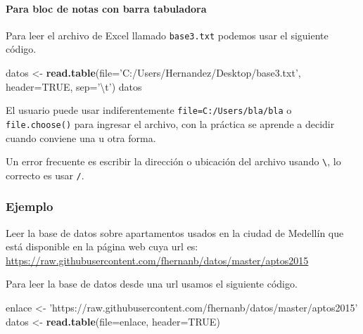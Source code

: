 \documentclass[10pt,]{krantz}
\makeatletter
\newenvironment{Shaded}{\begin{snugshade}}{\end{snugshade}}
\newcommand{\KeywordTok}[1]{\textcolor[rgb]{0.13,0.29,0.53}{\textbf{#1}}}
\newcommand{\DataTypeTok}[1]{\textcolor[rgb]{0.13,0.29,0.53}{#1}}
\newcommand{\CharTok}[1]{\textcolor[rgb]{0.31,0.60,0.02}{#1}}
\newcommand{\StringTok}[1]{\textcolor[rgb]{0.31,0.60,0.02}{#1}}
\newcommand{\OtherTok}[1]{\textcolor[rgb]{0.56,0.35,0.01}{#1}}
\newcommand{\NormalTok}[1]{#1}
\let\oldparagraph\paragraph
\renewcommand{\paragraph}[1]{\oldparagraph{#1}\mbox{}}
\newenvironment{kframe}{%
\medskip{}
\setlength{\fboxsep}{.8em}
 \def\at@end@of@kframe{}%
 \ifinner\ifhmode%
  \def\at@end@of@kframe{\end{minipage}}%
  \begin{minipage}{\columnwidth}%
 \fi\fi%
 \def\FrameCommand##1{\hskip\@totalleftmargin \hskip-\fboxsep
 \colorbox{shadecolor}{##1}\hskip-\fboxsep
     \hskip-\linewidth \hskip-\@totalleftmargin \hskip\columnwidth}%
 \MakeFramed {\advance\hsize-\width
   \@totalleftmargin\z@ \linewidth\hsize
   \@setminipage}}%
 {\par\unskip\endMakeFramed%
 \at@end@of@kframe}
\renewenvironment{Shaded}{\begin{kframe}}{\end{kframe}}
\let\BeginKnitrBlock\begin \let\EndKnitrBlock\end
\makeatother
\begin{document}
\paragraph{Para bloc de notas con barra
tabuladora}\label{para-bloc-de-notas-con-barra-tabuladora}

Para leer el archivo de Excel llamado \texttt{base3.txt} podemos usar el
siguiente código.

\begin{Shaded}
\begin{Highlighting}[]
\NormalTok{datos <-}\StringTok{ }\KeywordTok{read.table}\NormalTok{(}\DataTypeTok{file=}\StringTok{'C:/Users/Hernandez/Desktop/base3.txt'}\NormalTok{,}
                    \DataTypeTok{header=}\OtherTok{TRUE}\NormalTok{, }\DataTypeTok{sep=}\StringTok{'}\CharTok{\textbackslash{}t}\StringTok{'}\NormalTok{)}
\NormalTok{datos}
\end{Highlighting}
\end{Shaded}

\BeginKnitrBlock{rmdnote}
El usuario puede usar indiferentemente
\texttt{file=\textquotesingle{}C:/Users/bla/bla\textquotesingle{}} o
\texttt{file.choose()} para ingresar el archivo, con la práctica se
aprende a decidir cuando conviene una u otra forma.
\EndKnitrBlock{rmdnote}

\BeginKnitrBlock{rmdwarning}
Un error frecuente es escribir la dirección o ubicación del archivo
usando \texttt{\textbackslash{}}, lo correcto es usar \texttt{/}.
\EndKnitrBlock{rmdwarning}

\subsubsection*{Ejemplo}\label{ejemplo-10}

Leer la base de datos sobre apartamentos usados en la ciudad de Medellín
que está disponible en la página web cuya url es:
\url{https://raw.githubusercontent.com/fhernanb/datos/master/aptos2015}

Para leer la base de datos desde una url usamos el siguiente código.

\begin{Shaded}
\begin{Highlighting}[]
\NormalTok{enlace <-}\StringTok{ 'https://raw.githubusercontent.com/fhernanb/datos/master/aptos2015'}
\NormalTok{datos <-}\StringTok{ }\KeywordTok{read.table}\NormalTok{(}\DataTypeTok{file=}\NormalTok{enlace, }\DataTypeTok{header=}\OtherTok{TRUE}\NormalTok{)}
\end{Highlighting}
\end{Shaded}
\end{document}
